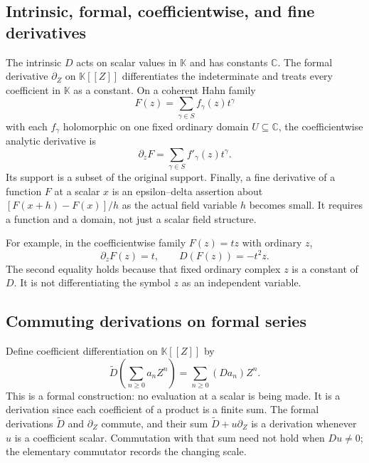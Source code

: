 \documentclass[11pt,a4paper]{article}
\numberwithin{equation}{section}
\theoremstyle{definition}
\theoremstyle{remark}
\newcommand{\K}{\mathbb K}
\newcommand{\C}{\mathbb C}
\newcommand{\DD}{\widetilde D}
\begin{document}
\subsection{Intrinsic, formal, coefficientwise, and fine derivatives}

The intrinsic $D$ acts on scalar values in $\K$ and has constants $\C$.
The formal derivative $\partial_Z$ on $\K[[Z]]$ differentiates the
indeterminate and treats every coefficient in $\K$ as a constant.
On a coherent Hahn family
\[
 F(z)=\sum_{\gamma\in S}f_\gamma(z)t^\gamma
\]
with each $f_\gamma$ holomorphic on one fixed ordinary domain $U\subseteq\C$,
the coefficientwise analytic derivative is
\[
 \partial_zF=\sum_{\gamma\in S}f'_\gamma(z)t^\gamma.
\]
Its support is a subset of the original support. Finally, a fine derivative
of a function $F$ at a scalar $x$ is an epsilon--delta assertion about
$[F(x+h)-F(x)]/h$ as the actual field variable $h$ becomes small. It requires
a function and a domain, not just a scalar field structure.

For example, in the coefficientwise family $F(z)=tz$ with ordinary $z$,
\begin{equation}\label{eq:deriv-separator}
 \partial_zF(z)=t,\qquad D(F(z))=-t^2z.
\end{equation}
The second equality holds because that fixed ordinary complex $z$ is a
constant of $D$. It is not differentiating the symbol $z$ as an independent
variable.

\subsection{Commuting derivations on formal series}

Define coefficient differentiation on $\K[[Z]]$ by
\[
 \DD\left(\sum_{n\geq0}a_nZ^n\right)=\sum_{n\geq0}(Da_n)Z^n.
\]
This is a formal construction: no evaluation at a scalar is being made.
It is a derivation since each coefficient of a product is a finite sum.
The formal derivations $\DD$ and $\partial_Z$ commute, and their sum
$\DD+u\partial_Z$ is a derivation whenever $u$ is a coefficient scalar.
Commutation with that sum need not hold when $Du\ne0$; the elementary
commutator records the changing scale.
\end{document}

